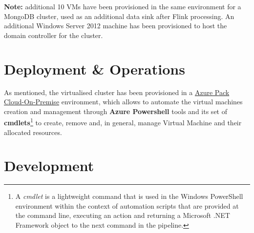 \textbf{Note:} additional 10 VMs have been provisioned in the same environment for a MongoDB cluster, used as an additional data sink after Flink processing. An additional Windows Server 2012 machine has been provisioned to host the domain controller for the cluster.

\section{Deployment \& Operations}

As mentioned, the virtualised cluster has been provisioned in a \href{https://www.microsoft.com/it-it/cloud-platform/windows-azure-pack}{Azure Pack Cloud-On-Premise} environment, which allows to automate the virtual machines creation and management through \textbf{Azure Powershell} tools and its set of \textbf{cmdlets}\footnote{A \textit{cmdlet} is a lightweight command that is used in the Windows PowerShell environment within the context of automation scripts that are provided at the command line, executing an action and returning a Microsoft .NET Framework object to the next command in the pipeline.} to create, remove and, in general, manage Virtual Machine and their allocated resources.







\section{Development}









